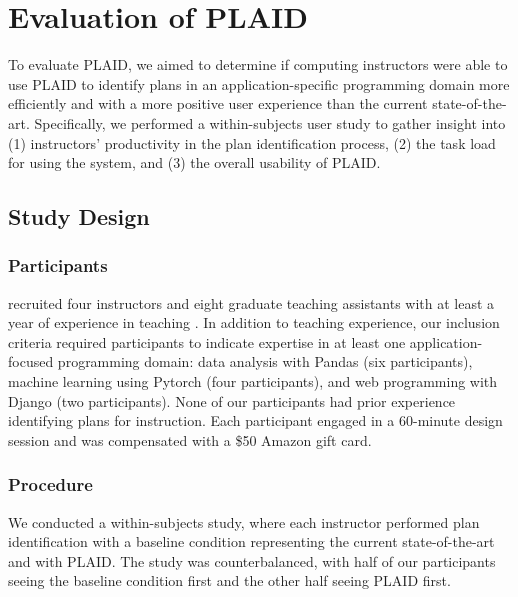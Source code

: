 \section{Evaluation of PLAID}
\label{sec:user-study}

To evaluate PLAID, we aimed to determine if computing instructors were able to use PLAID to identify plans in an application-specific programming domain more efficiently and with a more positive user experience than the current state-of-the-art. 
Specifically, we performed a within-subjects user study to gather insight into (1) instructors' productivity in the plan identification process, (2) the task load for using the system, and (3) the overall usability of PLAID. 



\subsection{Study Design}
\subsubsection{Participants}
 recruited four instructors and eight graduate teaching assistants with at least a year of experience in teaching . In addition to teaching experience, our inclusion criteria required participants to indicate expertise in at least one application-focused programming domain: data analysis with Pandas (six participants), machine learning using Pytorch (four participants), and web programming with Django (two participants). None of our participants had prior experience identifying plans for instruction. Each participant engaged in a 60-minute design session and was compensated with a \$50 Amazon gift card.

\subsubsection{Procedure}
We conducted a within-subjects study, where each instructor performed plan identification with a baseline condition representing the current state-of-the-art and with PLAID. The study was counterbalanced, with half of our participants seeing the baseline condition first and the other half seeing PLAID first.

